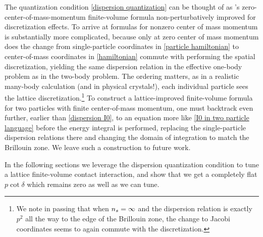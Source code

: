 The quantization condition \eqref{dispersion quantization} can be thought of as \Luscher's zero-center-of-mass-momentum finite-volume formula non-perturbatively improved for discretization effects.
To arrive at formulas for nonzero center of mass momentum is substantially more complicated, because only at zero center of mass momentum does the change from single-particle coordinates in \eqref{particle hamiltonian} to center-of-mass coordinates in \eqref{hamiltonian} commute with performing the spatial discretization, yielding the same dispersion relation in the effective one-body problem as in the two-body problem.
The ordering matters, as in a realistic many-body calculation (and in physical crystals!), each individual particle sees the lattice discretization.\footnote{
We note in passing that when ${n_s}=\infty$ and the dispersion relation is exactly $p^2$ all the way to the edge of the Brillouin zone, the change to Jacobi coordinates seems to again commute with the discretization.}
To construct a lattice-improved finite-volume formula for two particles with finite center-of-mass momentum, one must backtrack even further, earlier than \eqref{dispersion I0}, to an equation more like \eqref{I0 in two particle language} before the energy integral is performed, replacing the single-particle dispersion relations there and changing the domain of integration to match the Brillouin zone.
We leave such a construction to future work.

In the following sections we leverage the dispersion quantization condition to tune a lattice finite-volume contact interaction, and show that we get a completely flat $p \cot \delta$ which remains zero as well as we can tune.


